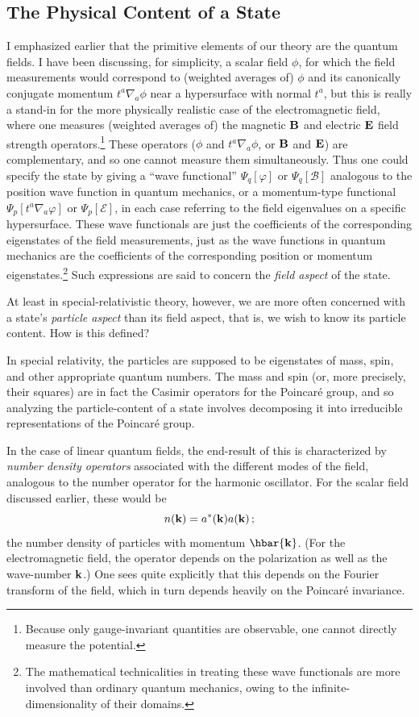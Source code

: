 \documentclass[
%
draft    %
,numberedheadings 
,bibliocites
  ]
  {aipproc}
\begin{document}
\subsection{The Physical Content of a State}

I emphasized earlier that the primitive elements of our theory are the quantum fields.  I have been discussing, for simplicity, a scalar field $\phi$, for which the field measurements would correspond to (weighted averages of)  $\phi $ and its canonically conjugate momentum $t^a\nabla _a\phi$ near a hypersurface with normal $t^a$, but this is really a stand-in for the more physically realistic case of the electromagnetic field, where one measures (weighted averages of) the  magnetic ${\bf B}$ and electric ${\bf E}$ field strength operators.\footnote{Because only gauge-invariant quantities are observable, one cannot directly measure the potential.}  These operators ($\phi$ and $t^a\nabla _a\phi$, or ${\bf B}$ and ${\bf E}$) are 
complementary, and so one cannot measure them simultaneously.  Thus one could specify the state by giving a ``wave functional'' $\Psi _q[\varphi ]$ or $\Psi _q [{\mathcal B}]$ analogous to the position wave function in quantum mechanics, or a momentum-type functional 
$\Psi _p[t^a\nabla _a\varphi ]$ or $\Psi _p[{\mathcal E}]$, in each case referring to the field eigenvalues on a specific hypersurface.  These wave functionals are just the coefficients of the corresponding eigenstates of the field measurements, just as the wave functions in quantum mechanics are the coefficients of the corresponding position or momentum eigenstates.\footnote{The mathematical technicalities in treating these wave functionals are more involved than ordinary quantum mechanics, owing to the infinite-dimensionality of their domains.}  Such expressions are said to concern the {\em field aspect} of the state.

At least in special-relativistic theory, however, we are more often concerned with a state's {\em particle aspect} than its field aspect, that is, we wish to know its particle content.  How is this defined?

In special relativity, the particles are supposed to be eigenstates of mass, spin, and other appropriate quantum numbers.  The mass and spin (or, more precisely, their squares) are in fact the Casimir operators for the Poincar\'e group, and so analyzing the particle-content of a state involves decomposing it into irreducible representations of the Poincar\'e group.

In the case of linear quantum fields, the end-result of this is characterized by {\em number density operators} associated with the different modes of the field, analogous to the number operator for the harmonic oscillator.  For the scalar field discussed earlier, these would be 
\begin{equation}
  n({\bf k})=a^*({\bf k}) a({\bf k})\, ;
\end{equation}
the number density of particles with momentum $\hbar{\bf k}$.
(For the electromagnetic field, the operator depends on the polarization as well as the wave-number ${\bf k}$.)
One sees quite explicitly that this depends on the Fourier transform of the field, which in turn depends heavily on the Poincar\'e invariance.
\end{document}
